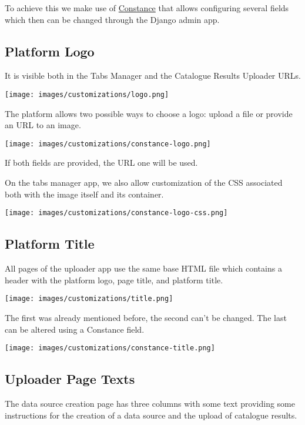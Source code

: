 \documentclass[
]{book}
\begin{document}
To achieve this we make use of \href{https://github.com/jazzband/django-constance}{Constance} that allows configuring several fields which then can be changed through the Django admin app.

\hypertarget{platform-logo}{%
\subsection*{Platform Logo}\label{platform-logo}}

It is visible both in the Tabs Manager and the Catalogue Results Uploader URLs.

\texttt{[image: images/customizations/logo.png]}

The platform allows two possible ways to choose a logo: upload a file or provide an URL to an image.

\texttt{[image: images/customizations/constance-logo.png]}

If both fields are provided, the URL one will be used.

On the tabs manager app, we also allow customization of the CSS associated both with the image itself and its container.

\texttt{[image: images/customizations/constance-logo-css.png]}

\hypertarget{platform-title}{%
\subsection*{Platform Title}\label{platform-title}}

All pages of the uploader app use the same base HTML file which contains a header with the platform logo, page title, and platform title.

\texttt{[image: images/customizations/title.png]}

The first was already mentioned before, the second can't be changed.
The last can be altered using a Constance field.

\texttt{[image: images/customizations/constance-title.png]}

\hypertarget{uploader-page-texts}{%
\subsection*{Uploader Page Texts}\label{uploader-page-texts}}

The data source creation page has three columns with some text providing some instructions for the creation of a data source and the upload of catalogue results.
\end{document}

